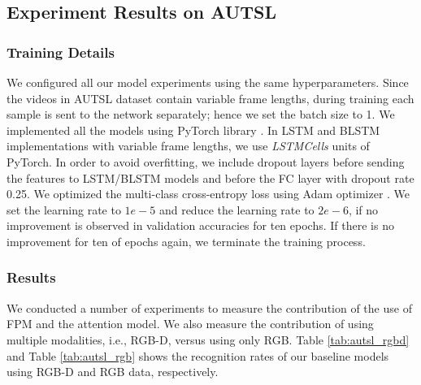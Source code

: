 \documentclass[11pt, a4paper, singlecolumn]{article}
\begin{document}
\subsection{Experiment Results on AUTSL}

\subsubsection{Training Details}
\label{sec:trainingDetails}
We configured all our model experiments using the same hyperparameters. Since the videos in AUTSL dataset contain variable frame lengths, during training each sample is sent to the network separately; hence we set the batch size to 1. We implemented all the models using PyTorch library \cite{paszke2019pytorch}. In LSTM and BLSTM implementations with variable frame lengths, we use \textit{LSTMCells} units of PyTorch. In order to avoid overfitting, we include dropout layers before sending the features to LSTM/BLSTM models and before the FC layer with dropout rate 0.25. We optimized the multi-class cross-entropy loss using Adam optimizer \cite{konur2015adam}. We set the learning rate to $1e-5$ and reduce the learning rate to $2e-6$, if no improvement is observed in validation accuracies for ten epochs. If there is no improvement for ten of epochs again, we terminate the training process.


\subsubsection{Results}
\label{sec:results}

We conducted a number of experiments to measure the contribution of the use of FPM and the attention model. We also measure the contribution of using multiple modalities, i.e., RGB-D, versus using only RGB. Table \ref{tab:autsl_rgbd} and Table \ref{tab:autsl_rgb} shows the recognition rates of our baseline models using RGB-D and RGB data, respectively. 
\end{document}
